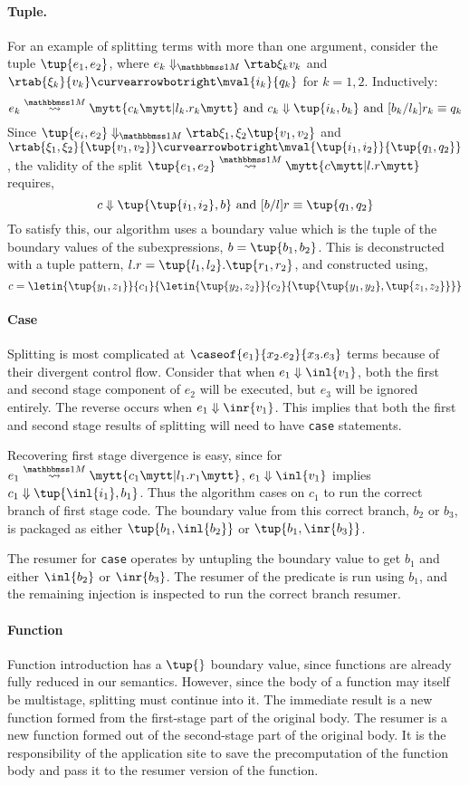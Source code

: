 \begin{abstrsyn}
\paragraph{Tuple.} For an example of splitting terms with more than one argument, consider the tuple $\tup{e_1,e_2}$,
where $\diaone {e_k} {\xi_k} {v_k}$ and $\rtab {\xi_k} {v_k} \vsplito
\mval {i_k} {q_k}$ for $k = 1,2$.  Inductively:
\[
	\splitone {e_k} A {c_k} {l_k.r_k} \text{ and } \reduce {c_k} {\tup{i_k,b_k}} \text{ and } [b_k/l_k]r_k \equiv q_k
\]
Since $\diaone {\tup{e_i,e_2}} {\xi_1,\xi_2} {\tup{v_1,v_2}}$ 
and $\rtab {\xi_1,\xi_2} {\tup{v_1,v_2}} \vsplito \mval {\tup{i_1,i_2}} {\tup{q_1,q_2}}$,
the validity of the split $\splitone {\tup{e_1,e_2}} A {c} {l.r}$ requires,
\[
	\reduce {c} {\tup{\tup{i_1,i_2},b}} \text{ and } [b/l]r \equiv \tup{q_1,q_2}
\]
To satisfy this, our algorithm uses a boundary value which is the tuple of the boundary values of the subexpressions,
$b = \tup{b_1,b_2}$. This is deconstructed with a tuple pattern, $l.r = \tup{l_1,l_2}.\tup{r_1,r_2}$,
and constructed using,
\[
c = \letin{\tup{y_1,z_1}}{c_1}{\letin{\tup{y_2,z_2}}{c_2}{\tup{\tup{y_1, y_2},\tup{z_1, z_2}}}}
\]

\paragraph {Case}
Splitting is most complicated at $\caseof {e_1} {x_2.e_2} {x_3.e_3}$ terms because of their divergent control flow.
Consider that when $\reduce {e_1} {\inl {v_1}}$, both the first and second stage component of $e_2$ will be executed, 
but $e_3$ will be ignored entirely. The reverse occurs when $\reduce {e_1} {\inr {v_1}}$.
This implies that both the first and second stage results of splitting will need to have \texttt{case} statements.

Recovering first stage divergence is easy, since for $\splitone {e_1} ? {c_1} {l_1.r_1}$, 
$\reduce {e_1} {\inl {v_1}}$ implies $\reduce {c_1} {\tup{\inl {i_1},b_1}}$.
Thus the algorithm cases on $c_1$ to run the correct branch of first stage code.
The boundary value from this correct branch, $b_2$ or $b_3$, is packaged as either $\tup {b_1, \inl {b_2}}$ or $\tup {b_1, \inr {b_3}}$.

The resumer for \texttt{case} operates by untupling the boundary value to get $b_1$ and either $\inl {b_2}$ or $\inr {b_3}$.
The resumer of the predicate is run using $b_1$, and the remaining injection is inspected to run the correct branch resumer.

\paragraph {Function} 
Function introduction has a $\tup{}$ boundary value,
since functions are already fully reduced in our semantics.
However, since the body of a function may itself be multistage, splitting must continue into it.
The immediate result is a new function formed from the first-stage part of the original body.
The resumer is a new function formed out of the second-stage part of the original body.
It is the responsibility of the application site to save the precomputation of the function body
and pass it to the resumer version of the function.


\end{abstrsyn}
